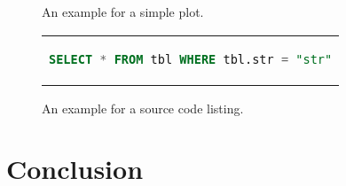 \begin{figure}[htpb]
	\centering
	
	\exampleA
	\exampleB
	\caption[Example plot]{An example for a simple plot.}\label{fig:sample-plot}
\end{figure}

\begin{figure}[htpb]
	\centering
	\begin{tabular}{c}
		\begin{lstlisting}[language=SQL]
		SELECT * FROM tbl WHERE tbl.str = "str"
		\end{lstlisting}
	\end{tabular}
	\caption[Example listing]{An example for a source code listing.}\label{fig:sample-listing}
\end{figure}


\section{Conclusion}

